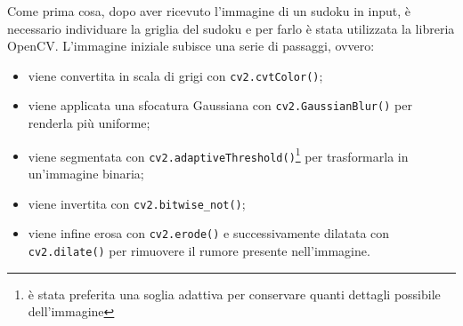 \documentclass[a4paper, 10pt]{article}
\begin{document}
Come prima cosa, dopo aver ricevuto l'immagine di un sudoku in input, è
necessario individuare la griglia del sudoku e per farlo è stata utilizzata la
libreria OpenCV. L'immagine iniziale subisce una serie di passaggi, ovvero:

\begin{itemize}
    \item viene convertita in scala di grigi con
        \texttt{cv2.cvtColor()};
    \item viene applicata una sfocatura Gaussiana con
        \texttt{cv2.GaussianBlur()} per renderla più uniforme;
    \item viene segmentata con
        \texttt{cv2.adaptiveThreshold()}\footnote{è stata preferita
        una soglia adattiva per conservare quanti dettagli possibile
        dell'immagine} per trasformarla in un'immagine binaria;
    \item viene invertita con \texttt{cv2.bitwise_not()};
    \item viene infine erosa con \texttt{cv2.erode()} e
        successivamente dilatata con \\ \texttt{cv2.dilate()} per
        rimuovere il rumore presente nell'immagine.
\end{itemize}
\end{document}
